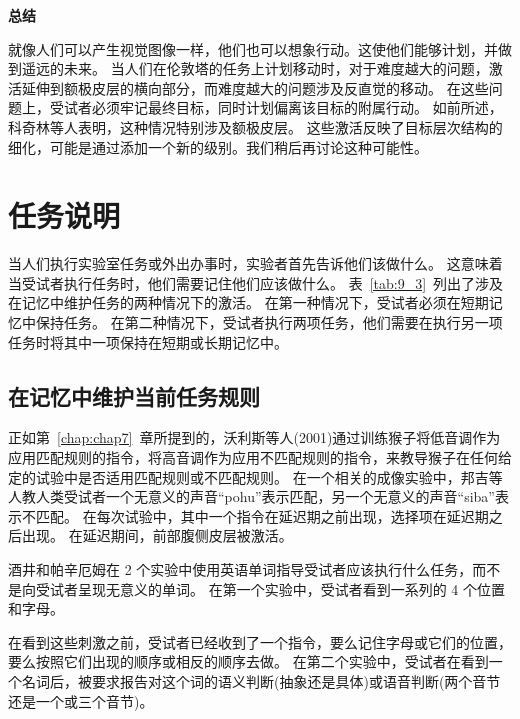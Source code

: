 \textbf{总结}

就像人们可以产生视觉图像一样，他们也可以想象行动。这使他们能够计划，并做到遥远的未来。
当人们在伦敦塔的任务上计划移动时，对于难度越大的问题，激活延伸到额极皮层的横向部分\cite{dagher1999mapping}，而难度越大的问题涉及反直觉的移动。
在这些问题上，受试者必须牢记最终目标，同时计划偏离该目标的附属行动。
如前所述，科奇林等人\cite{koechlin1999role}表明，这种情况特别涉及额极皮层。
这些激活反映了目标层次结构的细化，可能是通过添加一个新的级别。我们稍后再讨论这种可能性。



\section{任务说明}
\par

当人们执行实验室任务或外出办事时，实验者首先告诉他们该做什么。
这意味着当受试者执行任务时，他们需要记住他们应该做什么。
表~\ref{tab:9_3}~列出了涉及在记忆中维护任务的两种情况下的激活。
在第一种情况下，受试者必须在短期记忆中保持任务。
在第二种情况下，受试者执行两项任务，他们需要在执行另一项任务时将其中一项保持在短期或长期记忆中。



\subsection{在记忆中维护当前任务规则}
\par

正如第~\ref{chap:chap7}~章所提到的，沃利斯等人(2001)通过训练猴子将低音调作为应用匹配规则的指令，将高音调作为应用不匹配规则的指令，来教导猴子在任何给定的试验中是否适用匹配规则或不匹配规则。
在一个相关的成像实验中，邦吉等人\cite{bunge2003neural}教人类受试者一个无意义的声音“pohu”表示匹配，另一个无意义的声音“siba”表示不匹配。
在每次试验中，其中一个指令在延迟期之前出现，选择项在延迟期之后出现。
在延迟期间，前部腹侧皮层被激活。
\par


酒井和帕辛厄姆\cite{sakai2003prefrontal,sakai2006prefrontal}在 2 个实验中使用英语单词指导受试者应该执行什么任务，而不是向受试者呈现无意义的单词。
在第一个实验中，受试者看到一系列的 4 个位置和字母。
\par


在看到这些刺激之前，受试者已经收到了一个指令，要么记住字母或它们的位置，要么按照它们出现的顺序或相反的顺序去做\cite{sakai2003prefrontal}。
在第二个实验中，受试者在看到一个名词后，被要求报告对这个词的语义判断(抽象还是具体)或语音判断(两个音节还是一个或三个音节)。


